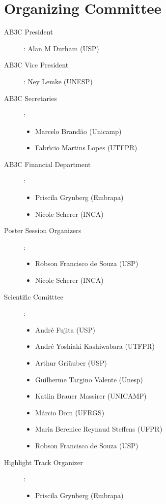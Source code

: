 
\chapter{Organizing Committee}

\begin{description}

 \item[AB3C President]: Alan M Durham (USP)

\item[AB3C Vice President]: Ney Lemke (UNESP)

  
\item[AB3C Secretaries]:

\begin{itemize}
 \item Marcelo Brand\~ao (Unicamp) 
 \item Fabr\'{\i}cio Martins Lopes  (UTFPR)
\end{itemize}

\item[AB3C Financial Department]:

\begin{itemize}
\item Priscila Grynberg (Embrapa)
\item Nicole Scherer (INCA)
\end{itemize}


\item[Poster Session Organizers]:

\begin{itemize}
\item Robson Francisco de Souza (USP)
\item Nicole Scherer (INCA)
\end{itemize}

 \item[Scientific Comitttee]:

  \begin{itemize}
    \item  Andr\'e Fujita (USP)
    \item  Andr\'e Yoshiaki Kashiwabara (UTFPR)
    \item Arthur Gri\"uuber (USP)
    \item Guilherme Targino Valente (Unesp)
    \item Katlin Brauer Massirer (UNICAMP)
    \item M\'arcio Dom (UFRGS)
    \item Maria Berenice Reynaud Steffens (UFPR)
    \item Robson Francisco de Souza (USP)
  \end{itemize}
\item[Highlight Track Organizer]:
\begin{itemize}
\item Priscila Grynberg (Embrapa)
\end{itemize} 
\end{description}


